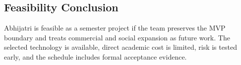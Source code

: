 \documentclass[11pt,a4paper]{article}
\begin{document}
\subsection{Feasibility Conclusion}
Abhijatri is feasible as a semester project if the team preserves the MVP boundary and treats commercial and social expansion as future work. The selected technology is available, direct academic cost is limited, risk is tested early, and the schedule includes formal acceptance evidence.
\end{document}

